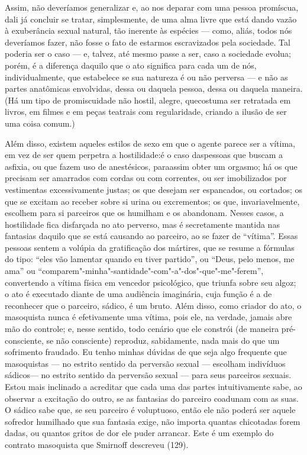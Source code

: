 Assim, não deveríamos generalizar e, ao nos deparar com uma pessoa
promíscua, dali já concluir se tratar, simplesmente, de uma alma livre
que está dando vazão à exuberância sexual natural, tão inerente às
espécies --- como, aliás, todos nós deveríamos fazer, não fosse o fato de
estarmos escravizados pela sociedade. Tal poderia ser o caso --- e,
talvez, até mesmo passe a ser, caso a sociedade evolua; porém, é a
diferença daquilo que o ato significa para cada um de nós,
individualmente, que estabelece se sua natureza é ou não perversa --- e
não as partes anatômicas envolvidas, dessa ou daquela pessoa, dessa ou
daquela maneira. (Há um tipo de promiscuidade não hostil, alegre, que\idxpromismora[|)]
costuma ser retratada em livros, em filmes e em peças teatrais com
regularidade, criando a ilusão de ser uma coisa comum.)

Além disso, existem aqueles estilos de sexo em que o agente parece
ser a vítima, em vez de ser quem perpetra a hostilidade:\idxmasoq[|(] é o caso das\idxsadihost[|)]
pessoas que buscam a asfixia, ou que fazem uso de anestésicos, para\idxsadimaso[|(]
assim obter um orgasmo; há os que precisam ser amarrados\idxamarr{} com cordas ou
com correntes, ou ser imobilizados por vestimentas excessivamente
justas; os que desejam ser espancados, ou cortados; os que se excitam
ao receber sobre si urina ou excrementos; os que, invariavelmente,
escolhem para si parceiros que os humilham e os abandonam. Nesses
casos, a hostilidade\idxmasoqhos{} fica disfarçada no ato perverso, mas é
secretamente mantida nas fantasias\idxmasoqfan{} daquilo que se está causando ao
parceiro, ao se fazer de ``vítima''. Essas pessoas sentem a volúpia da
gratificação dos mártires, que se resume a fórmulas do tipo: ``eles vão
lamentar quando eu tiver partido'', ou ``Deus, pelo menos, me ama'' ou
``comparem"-minha"-santidade"-com"-a"-dos"-que"-me"-ferem'', convertendo a vítima
física em vencedor psicológico, que triunfa sobre seu algoz; o ato é
executado diante de uma audiência imaginária, cuja função é a de
reconhecer que o parceiro, sádico, é um bruto. Além disso, como criador
do ato, o masoquista nunca é efetivamente uma vítima, pois ele, na
verdade, jamais abre mão do controle; e, nesse sentido, todo cenário
que ele constrói (de maneira pré-consciente, se não consciente)
reproduz, sabidamente, nada mais do que um sofrimento fraudado. Eu
tenho minhas dúvidas de que seja algo frequente que masoquistas --- no
estrito sentido da perversão sexual --- escolham indivíduos sádicos\idxmasoqsad[|(] --- no
estrito sentido da perversão sexual --- para seus parceiros sexuais.
Estou mais inclinado a acreditar que cada uma das partes intuitivamente
sabe, ao observar a excitação do outro, se as fantasias do parceiro
coadunam com as suas. O sádico sabe que, se seu parceiro é voluptuoso,
então ele não poderá ser aquele sofredor humilhado que sua fantasia
exige, não importa quantas chicotadas forem dadas, ou quantos gritos de
dor ele puder arrancar. Este é um exemplo do contrato masoquista que
Smirnoff\idxsmirn{} descreveu (129).

